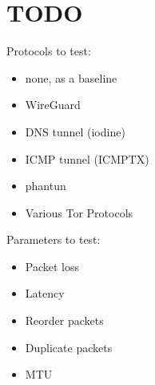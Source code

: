 
\chapter{TODO}

Protocols to test:
\begin{itemize}
  \item none, as a baseline
  \item WireGuard
  \item DNS tunnel (iodine)
  \item ICMP tunnel (ICMPTX)
  \item phantun
  \item Various Tor Protocols
\end{itemize}


Parameters to test:
\begin{itemize}
  \item Packet loss
  \item Latency
  \item Reorder packets
  \item Duplicate packets
  \item MTU
\end{itemize}
